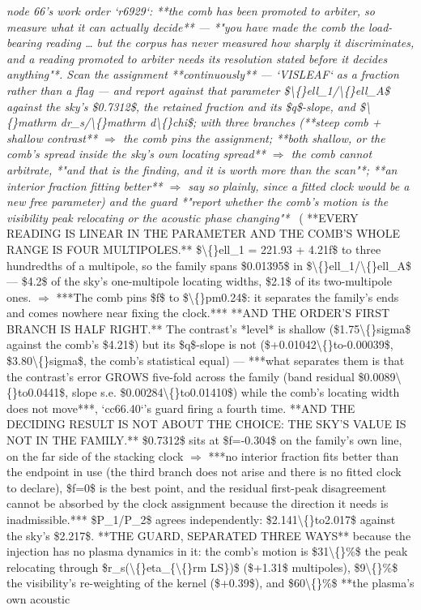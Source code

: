 \begin{description}
\textit{node 66's work order `r6929`: **the comb has been promoted to arbiter, so measure what it can actually decide** --- *"you have made the comb the load-bearing reading \ldots{} but the corpus has never measured how sharply it discriminates, and a reading promoted to arbiter needs its resolution stated before it decides anything"*. Scan the assignment **continuously** --- `VISLEAF` as a fraction rather than a flag --- and report against that parameter \$\textbackslash\{\}ell\_1/\textbackslash\{\}ell\_A\$ against the sky's \$0.7312\$, the retained fraction and its \$q\$-slope, and \$\textbackslash\{\}mathrm dr\_s/\textbackslash\{\}mathrm d\textbackslash\{\}chi\$; with three branches (**steep comb + shallow contrast** \ensuremath{\Rightarrow} the comb pins the assignment; **both shallow, or the comb's spread inside the sky's own locating spread** \ensuremath{\Rightarrow} the comb cannot arbitrate, *"and that is the finding, and it is worth more than the scan"*; **an interior fraction fitting better** \ensuremath{\Rightarrow} say so plainly, since a fitted clock would be a new free parameter) and the guard *"report whether the comb's motion is the visibility peak relocating or the acoustic phase changing"*} \ ( **EVERY READING IS LINEAR IN THE PARAMETER AND THE COMB'S WHOLE RANGE IS FOUR MULTIPOLES.** \$\textbackslash\{\}ell\_1 = 221.93 + 4.21f\$ to three hundredths of a multipole, so the family spans \$0.01395\$ in \$\textbackslash\{\}ell\_1/\textbackslash\{\}ell\_A\$ --- \$4.2\$ of the sky's one-multipole locating widths, \$2.1\$ of its two-multipole ones. \ensuremath{\Rightarrow} ***The comb pins \$f\$ to \$\textbackslash\{\}pm0.24\$: it separates the family's ends and comes nowhere near fixing the clock.***  **AND THE ORDER'S FIRST BRANCH IS HALF RIGHT.** The contrast's *level* is shallow (\$1.75\textbackslash\{\}sigma\$ against the comb's \$4.21\$) but its \$q\$-slope is not (\$+0.01042\textbackslash\{\}to-0.00039\$, \$3.80\textbackslash\{\}sigma\$, the comb's statistical equal) --- ***what separates them is that the contrast's error GROWS five-fold across the family (band residual \$0.0089\textbackslash\{\}to0.0441\$, slope s.e. \$0.00284\textbackslash\{\}to0.01410\$) while the comb's locating width does not move***, `cc66.40`'s guard firing a fourth time.  **AND THE DECIDING RESULT IS NOT ABOUT THE CHOICE: THE SKY'S VALUE IS NOT IN THE FAMILY.** \$0.7312\$ sits at \$f=-0.304\$ on the family's own line, on the far side of the stacking clock \ensuremath{\Rightarrow} ***no interior fraction fits better than the endpoint in use (the third branch does not arise and there is no fitted clock to declare), \$f=0\$ is the best point, and the residual first-peak disagreement cannot be absorbed by the clock assignment because the direction it needs is inadmissible.***  \$P\_1/P\_2\$ agrees independently: \$2.141\textbackslash\{\}to2.017\$ against the sky's \$2.217\$.  **THE GUARD, SEPARATED THREE WAYS** because the injection has no plasma dynamics in it: the comb's motion is \$31\textbackslash\{\}\%\$ the peak relocating through \$r\_s(\textbackslash\{\}eta\_\{\textbackslash\{\}rm LS\})\$ (\$+1.31\$ multipoles), \$9\textbackslash\{\}\%\$ the visibility's re-weighting of the kernel (\$+0.39\$), and \$60\textbackslash\{\}\%\$ **the plasma's own acoustic 
\end{description}
